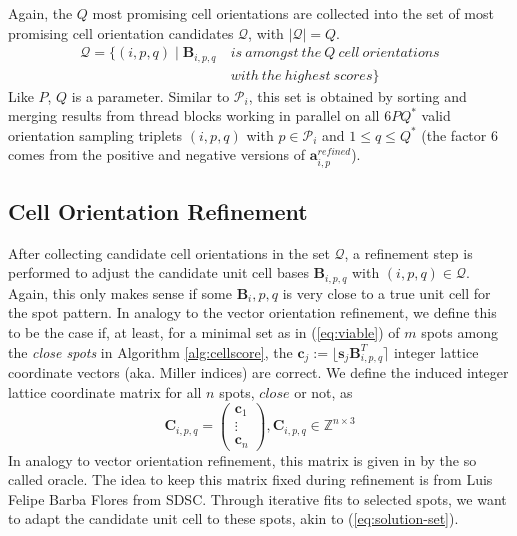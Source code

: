 \documentclass[a4paper,10pt]{article}
\newcommand{\vect}[1]{\mathbf{#1}}
\newcommand{\mat}[1]{\mathbf{#1}}
\newcommand{\round}[1]{\lfloor #1 \rceil}
\begin{document}
Again, the $Q$ most promising cell orientations are collected into the set of most promising cell orientation candidates $\mathcal{Q}$, with $|\mathcal{Q}|=Q$.
%
\[
\begin{split}
\mathcal{Q} = \{ (i,p,q) \mid \mat{B}_{i,p,q}\ &is\ amongst\ the\ Q\ cell\ orientations \\
                                               &with\ the\ highest\ scores \}
\end{split}
\]
%
Like $P$, $Q$ is a parameter. Similar to $\mathcal{P}_i$, this set is obtained by sorting and merging results from thread blocks working in parallel on all $6PQ^*$ valid orientation sampling triplets $(i,p,q)$ with $p\in \mathcal{P}_i$ and $1\leq q\leq Q^*$ (the factor 6 comes from the positive and negative versions of $\vect{a}_{i,p}^{refined}$).

\subsection{Cell Orientation Refinement}

After collecting candidate cell orientations in the set $\mathcal{Q}$, a refinement step is performed to adjust the candidate unit cell bases $\mat{B}_{i,p,q}$ with $(i,p,q)\in \mathcal{Q}$. Again, this only makes sense if some $\mat{B}_i,p,q$ is very close to a true unit cell for the spot pattern. In analogy to the vector orientation refinement, we define this to be the case if, at least, for a minimal set as in (\ref{eq:viable}) of $m$ spots among the \emph{close spots} in Algorithm \ref{alg:cellscore}, the $\vect{c}_j := \round{\vect{s}_j\mat{B}_{i,p,q}^T}$ integer lattice coordinate vectors (aka. Miller indices) are correct. We define the induced integer lattice coordinate matrix for all $n$ spots, $close$ or not, as
%
\[
 \mat{C}_{i,p,q} = \begin{pmatrix} \vect{c}_1 \\ \vdots \\ \vect{c}_n \end{pmatrix}, \mat{C}_{i,p,q}\in \mathbb{Z}^{n\times 3}
\]
%
In analogy to vector orientation refinement, this matrix is given in \cite{toro-indexer} by the so called oracle. The idea to keep this matrix fixed during refinement is from Luis Felipe Barba Flores from SDSC. Through iterative fits to selected spots, we want to adapt the candidate unit cell to these spots, akin to (\ref{eq:solution-set}).
\end{document}
